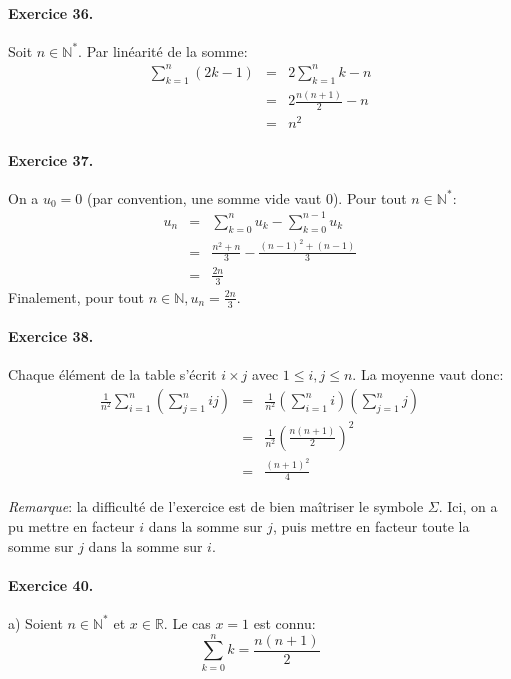 \paragraph{Exercice 36.} Soit $n\in\mathbb{N^*}$. Par linéarité de la somme:
\begin{eqnarray}
  \sum_{k=1}^n{(2k-1)} &=& 2\sum_{k=1}^n{k}-n \nonumber \\ 
                      &=& 2\frac{n(n+1)}{2}-n \nonumber \\ 
                      &=& n^2 \nonumber
\end{eqnarray}

\paragraph{Exercice 37.} On a $u_0=0$ (par convention, une somme vide vaut 0). Pour tout $n\in\mathbb{N}^*$:
\begin{eqnarray}
  u_n &=& \sum_{k=0}^n{u_k} - \sum_{k=0}^{n-1}{u_k} \nonumber \\ 
                      &=& \frac{n^2 + n}{3}- \frac{(n-1)^2 + (n-1)}{3}\nonumber \\ 
                      &=& \frac{2n}{3} \nonumber
\end{eqnarray}
Finalement, pour tout $n\in\mathbb{N}, u_n=\frac{2n}{3}$.

\paragraph{Exercice 38.} Chaque élément de la table s’écrit $i\times j$ avec $1\leq i,j\leq n$. La moyenne vaut donc:
\begin{eqnarray}
\frac{1}{n^2}\sum_{i=1}^n{\left(\sum_{j=1}^n{ij}\right)} &=& \frac{1}{n^2}\left(\sum_{i=1}^n{i}\right)\left(\sum_{j=1}^n{j}\right) \nonumber \\
&=& \frac{1}{n^2}\left(\frac{n(n+1)}{2}\right)^2 \nonumber \\
&=& \frac{(n+1)^2}{4} \nonumber 
\end{eqnarray}


\textit{Remarque}: la difficulté de l'exercice est de bien maîtriser le symbole $\Sigma$. Ici, on a pu mettre en facteur $i$ dans la somme sur $j$, puis mettre en facteur toute la somme sur $j$ dans la somme sur $i$.
\paragraph{Exercice 40.} a) Soient $n\in\mathbb{N}^*$ et $x\in\mathbb{R}$. Le cas $x=1$ est connu:
\[
\sum_{k=0}^n{k} = \frac{n(n+1)}{2}
\]

